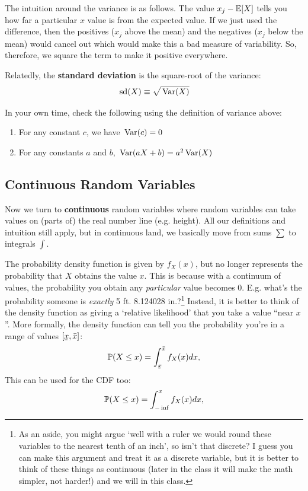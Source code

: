 \documentclass[12pt]{article}
\begin{document}
The intuition around the variance is as follows. The value $x_j - \expec{X}$ tells you how far a particular $x$ value is from the expected value. If we just used the difference, then the positives ($x_j$ above the mean) and the negatives ($x_j$ below the mean) would cancel out which would make this a bad measure of variability. So, therefore, we square the term to make it positive everywhere.

Relatedly, the \textbf{standard deviation} is the square-root of the variance:
$$
  \sd{X} \equiv \sqrt{\var{X}}
$$

In your own time, check the following using the definition of variance above:
\begin{enumerate}
  \item For any constant $c$, we have $\var{c} = 0$

  \item For any constants $a$ and $b$, $\var{aX + b} = a^2 \var{X}$
\end{enumerate}


\subsection*{Continuous Random Variables}

Now we turn to \textbf{continuous} random variables where random variables can take values on (parts of) the real number line (e.g. height). All our definitions and intuition still apply, but in continuous land, we basically move from sums $\sum$ to integrals $\int$.

The probability density function is given by $f_{X}(x)$, but no longer represents the probability that $X$ obtains the value $x$. This is because with a continuum of values, the probability you obtain any \emph{particular} value becomes 0. E.g. what's the probability someone is \emph{exactly} 5 ft. 8.124028 in.?\footnote{As an aside, you might argue `well with a ruler we would round these variables to the nearest tenth of an inch', so isn't that discrete? I guess you can make this argument and treat it as a discrete variable, but it is better to think of these things as continuous (later in the class it will make the math simpler, not harder!) and we will in this class.}
Instead, it is better to think of the density function as giving a `relative likelihood' that you take a value ``near $x$''. More formally, the density function can tell you the probability you're in a range of values $[\ubar{x}, \bar{x}]$:
$$
  \P{X \leq x} = \int_{\ubar{x}}^{\bar{x}} f_{X}(x) dx,
$$
This can be used for the CDF too:
$$
  \P{X \leq x} = \int_{-\inf}^x f_{X}(x) dx,
$$
\end{document}
